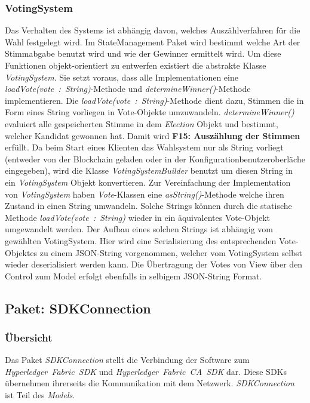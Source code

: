 \documentclass[parskip=full]{scrartcl}
\newcommand{\textitx}[1]{\mbox{\textit{#1}}}
\begin{document}
		\subsubsection{VotingSystem}
		Das Verhalten des Systems ist abhängig davon, welches Auszählverfahren für die Wahl festgelegt wird. Im StateManagement Paket wird bestimmt welche Art der Stimmabgabe benutzt wird und wie der Gewinner ermittelt wird.
		Um diese Funktionen objekt-orientiert zu entwerfen existiert die abstrakte Klasse \textitx{VotingSystem}. Sie setzt voraus, dass alle Implementationen eine \textitx{loadVote(vote : String)}-Methode und \textitx{determineWinner()}-Methode implementieren. Die \textitx{loadVote(vote : String)}-Methode dient dazu, Stimmen die in Form eines String vorliegen in Vote-Objekte umzuwandeln. \textitx{determineWinner()} evaluiert alle gespeicherten Stimme in dem \textitx{Election} Objekt und bestimmt, welcher Kandidat gewonnen hat. Damit wird \textbf{F15: Auszählung der Stimmen} erfüllt.
		Da beim Start eines Klienten das Wahlsystem nur als String vorliegt (entweder von der Blockchain geladen oder in der Konfigurationbenutzeroberläche eingegeben), wird die Klasse \textit{VotingSystemBuilder} benutzt um diesen String in ein \textitx{VotingSystem} Objekt konvertieren.
		Zur Vereinfachung der Implementation von \textitx{VotingSystem} haben \textitx{Vote}-Klassen eine \textitx{asString()}-Methode welche ihren Zustand in einen String umwandeln. Solche Strings können durch die statische Methode \textitx{loadVote(vote : String)} wieder in ein äquivalentes Vote-Objekt umgewandelt werden. Der Aufbau eines solchen Strings ist abhängig vom gewählten VotingSystem. Hier wird eine Serialisierung des entsprechenden Vote-Objektes zu einem JSON-String vorgenommen, welcher vom VotingSystem selbst wieder deserialisiert werden kann. Die Übertragung der Votes von View über den Control zum Model erfolgt ebenfalls in selbigem JSON-String Format.
	
	\subsection{Paket: SDKConnection}
	\subsubsection{Übersicht}
	Das Paket \textitx{SDKConnection} stellt die Verbindung der Software zum \textitx{Hyperledger Fabric SDK} und \textitx{Hyperledger Fabric CA SDK} dar. Diese SDKs übernehmen ihrerseits die Kommunikation mit dem Netzwerk. \textitx{SDKConnection} ist Teil des \textitx{Models}.
\end{document}
